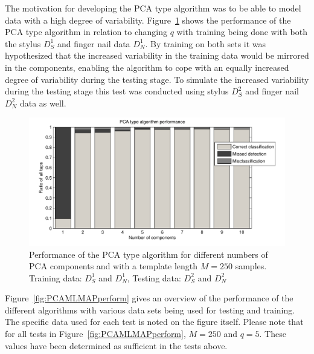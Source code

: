 The motivation for developing the PCA type algorithm was to be able to model data with a high degree of variability. Figure~\ref{fig:PCAperform_SN-SN} shows the performance of the PCA type algorithm in relation to changing $q$ with training being done with both the stylus $D^1_S$ and finger nail data $D^1_N$. By training on both sets it was hypothesized that the increased variability in the training data would be mirrored in the components, enabling the algorithm to cope with an equally increased degree of variability during the testing stage. To simulate the increased variability during the testing stage this test was conducted using stylus $D^2_S$ and finger nail $D^2_N$ data as well.

\begin{figure}[!] %
\centering
\includegraphics[width=150mm]{PCAperform_SN-SN.pdf}
\caption{Performance of the PCA type algorithm for different numbers of PCA components and with a template length $M=250$ samples. Training data: $D^1_S$ and $D^1_N$, Testing data: $D^2_S$ and $D^2_N$}\label{fig:PCAperform_SN-SN}
\end{figure}

Figure~\ref{fig:PCAMLMAPperform} gives an overview of the performance of the different algorithms with various data sets being used for testing and training. The specific data used for each test is noted on the figure itself. Please note that for all tests in Figure~\ref{fig:PCAMLMAPperform}, $M=250$ and $q=5$. These values have been determined as sufficient in the tests above.

